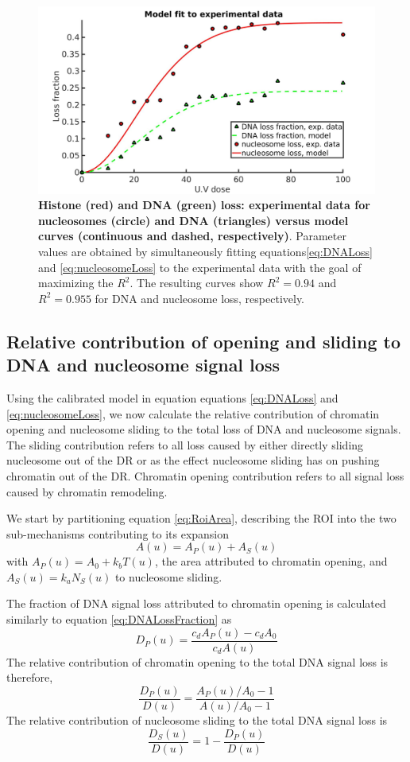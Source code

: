 \documentclass[12pt]{article}
\begin{document}
	
\begin{figure}[H]
\centering
\includegraphics[width=0.5\linewidth, height=0.3\textheight]{histoneAndDnaVsUvDoseModelFit}
\caption{\textbf{Histone (red) and DNA (green) loss: experimental data
	for nucleosomes (circle) and DNA (triangles) versus model curves
	(continuous and dashed, respectively)}. Parameter values are obtained
	by simultaneously fitting equations\eqref{eq:DNALoss}  and \eqref{eq:nucleosomeLoss} to the experimental data with
	the goal of maximizing the $R^2$. The resulting curves show $R^2 = 0.94$ and
	$R^2 = 0.955$ for DNA and nucleosome loss, respectively.}
\label{fig:histoneAndDnaVsUvDoseModelFit}
\end{figure}

\subsection{Relative contribution of opening and sliding to DNA
	and nucleosome signal loss}

Using the calibrated model in equation equations \eqref{eq:DNALoss} and \eqref{eq:nucleosomeLoss}, we now calculate the
relative contribution of chromatin opening and nucleosome sliding to the
total loss of DNA and nucleosome signals. The sliding contribution refers to all loss
caused by either directly sliding nucleosome out of the DR or as the effect
nucleosome sliding has on pushing chromatin out of the DR. Chromatin opening contribution refers to all signal loss caused by chromatin remodeling.

We start by partitioning equation \eqref{eq:RoiArea}, describing the ROI into the two sub-mechanisms contributing to its expansion 
\begin{equation*}
A(u) = A_P(u) +A_S(u)
\end{equation*}
with $A_P(u)=A_0+k_bT(u)$, the area attributed to chromatin opening, and $A_S(u)=k_aN_S(u)$ to nucleosome sliding. 

The fraction of DNA signal loss attributed to chromatin opening is calculated similarly to equation \eqref{eq:DNALossFraction} as 
\begin{equation*}
D_P(u)=\frac{c_dA_P(u)-c_dA_0}{c_dA(u)}
\end{equation*}
The relative contribution of chromatin opening to the total DNA signal loss is therefore,
\begin{equation}\label{eq:relativeOpeningDNA}
\frac{D_P(u)}{D(u)}=\frac{A_P(u)/A_0-1}{A(u)/A_0-1}
\end{equation}	
The relative contribution of nucleosome sliding to the total DNA signal loss is
\begin{equation}\label{eq:relativeSlidingDNA}
\frac{D_S(u)}{D(u)}=1-\frac{D_P(u)}{D(u)}
\end{equation}
\end{document}
